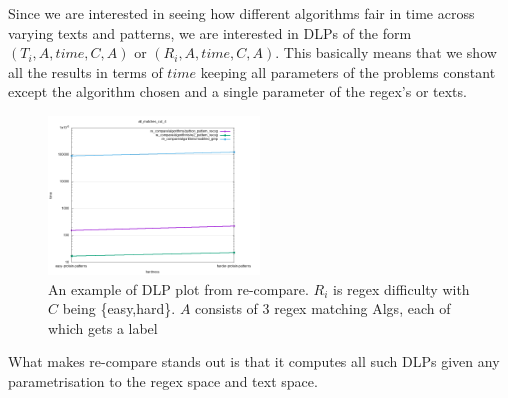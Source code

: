 \documentclass{article}
\numberwithin{theorem}{subsection}
\theoremstyle{remark}
\begin{document}
Since we are interested in seeing how different algorithms fair in time across varying texts and patterns, we are
interested in DLPs of the form $(T_{i},A,time,C,A)$ or $(R_{i},A,time,C,A)$.
This basically means that we show all the results in terms of $ time $ keeping all parameters of the problems constant except the algorithm chosen and a single parameter of the regex's or texts.

\begin{figure}[h]
	\centering
	\captionsetup{justification=centering,width=0.5\textwidth}
	\includegraphics[width=0.5\textwidth]{../output/all_matches_cut_4.png}
  \caption{An example of DLP plot from re-compare. $R_i$ is regex difficulty with $C$ being \{easy,hard\}. $A$ consists of $3$ regex matching Algs, each of which gets a label }
	\label{fig:medial}
\end{figure}

What makes re-compare stands out is that it computes all such DLPs given any parametrisation to the regex space and text space.
\end{document}
